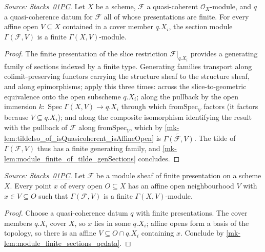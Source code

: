 \begin{lemma}
  \label{mk-lem:module_finite_sections_qcdata}
  \leanok

  \textit{Source: Stacks~\href{https://stacks.math.columbia.edu/tag/01PC}{01PC}.}
  Let \(X\) be a scheme, \(\mathcal F\) a quasi-coherent
  \(\mathcal O_X\)-module, and \(q\) a quasi-coherence datum for
  \(\mathcal F\) all of whose presentations are finite. For every affine open
  \(V \subseteq X\) contained in a cover member \(q.X_i\), the section module
  \(\Gamma(\mathcal F, V)\) is a finite \(\Gamma(X, V)\)-module.
\end{lemma}
\begin{proof}
  \leanok
  The finite presentation of the slice restriction
  \(\mathcal F|_{q.X_i}\) provides a generating family of sections indexed by
  a finite type. Generating families transport along colimit-preserving
  functors carrying the structure sheaf to the structure sheaf, and along
  epimorphisms; apply this three times: across the slice-to-geometric
  equivalence onto the open subscheme \(q.X_i\); along the pullback by the
  open immersion \(k : \operatorname{Spec} \Gamma(X, V) \to q.X_i\) through
  which \(\mathrm{fromSpec}_V\) factors (it factors because
  \(V \subseteq q.X_i\)); and along the composite isomorphism identifying the
  result with the pullback of \(\mathcal F\) along \(\mathrm{fromSpec}_V\),
  which by \ref{mk-lem:tildeIso_of_isQuasicoherent_isAffineOpen} is
  \(\widetilde{\Gamma(\mathcal F, V)}\). The tilde of
  \(\Gamma(\mathcal F, V)\) thus has a finite generating family, and
  \ref{mk-lem:module_finite_of_tilde_genSections} concludes.
\end{proof}

\begin{lemma}
  \label{mk-lem:affine_finite_sections_nhds}
  \leanok

  \textit{Source: Stacks~\href{https://stacks.math.columbia.edu/tag/01PC}{01PC}.}
  Let \(\mathcal F\) be a module sheaf of finite presentation on a scheme
  \(X\). Every point \(x\) of every open \(O \subseteq X\) has an affine open
  neighbourhood \(V\) with \(x \in V \subseteq O\) such that
  \(\Gamma(\mathcal F, V)\) is a finite \(\Gamma(X, V)\)-module.
\end{lemma}
\begin{proof}
  \leanok
  Choose a quasi-coherence datum \(q\) with finite presentations. The cover
  members \(q.X_i\) cover \(X\), so \(x\) lies in some \(q.X_i\); affine opens
  form a basis of the topology, so there is an affine
  \(V \subseteq O \cap q.X_i\) containing \(x\). Conclude by
  \ref{mk-lem:module_finite_sections_qcdata}.
\end{proof}


